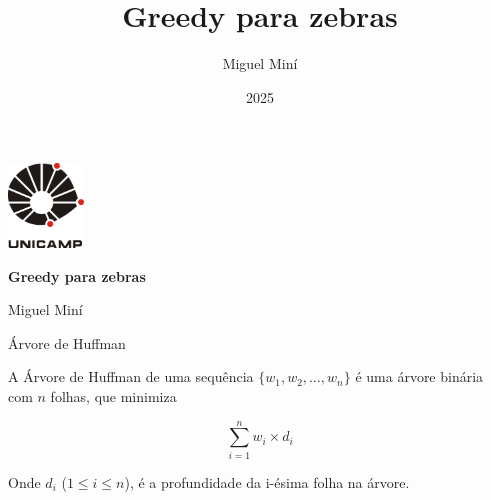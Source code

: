 \documentclass[12pt]{beamer}
\title{Greedy para zebras}
\author{Miguel Miní}
\date{2025}
\begin{document}
\begin{frame}

  {\hspace{9cm}\includegraphics[width=0.15\textwidth]{img/unicamp.png}}
  
  
  
  {\hspace{0.5cm}\bfseries\Huge \textcolor{rojoUNI}{Greedy para zebras}}

   \vspace{0.5cm}
  {\hspace{0.6cm}\textcolor{rojoUNI}{Miguel Miní}}
  
  \vfill
\end{frame}


\begin{frame}{Árvore de Huffman}

\begin{definicao}
    A Árvore de Huffman de uma sequência $\{w_1, w_2, \dots, w_n\}$ é uma árvore binária com $n$ folhas, que minimiza

\[
    \sum_{i=1}^n w_i \times d_i  
\]

    Onde $d_i$ ($1 \le i \le n$), é a profundidade da i-ésima folha na árvore.
\end{definicao}
  
\end{frame}
\end{document}
